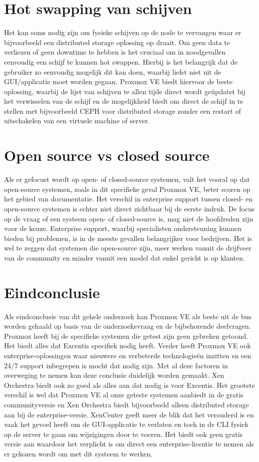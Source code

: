 \section{Hot swapping van schijven}
Het kan soms nodig zijn om fysieke schijven op de node te vervangen waar er bijvoorbeeld een distributed storage oplossing op draait. Om geen data te verliezen of geen downtime te hebben is het cruciaal om in noodgevallen eenvoudig een schijf te kunnen hot swappen.
Hierbij is het belangrijk dat de gebruiker zo eenvoudig mogelijk dit kan doen, waarbij liefst niet uit de GUI/applicatie moet worden gegaan.
Proxmox VE biedt hiervoor de beste oplossing, waarbij de lijst van schijven te allen tijde direct wordt geüpdatet bij het verwisselen van de schijf en de mogelijkheid biedt om direct de schijf in te stellen met bijvoorbeeld CEPH voor distributed storage zonder een restart of uitschakelen van een virtuele machine of server.
\newpage
\section{Open source vs closed source}
Als er gefocust wordt op open- of closed-source systemen, valt het vooral op dat open-source systemen, zoals in dit specifieke geval Proxmox VE, beter scoren op het gebied van documentatie. Het verschil in enterprise support tussen closed- en open-source systemen is echter niet direct zichtbaar bij de eerste indruk.
De focus op de vraag of een systeem open- of closed-source is, mag niet de hoofdreden zijn voor de keuze. Enterprise support, waarbij specialisten ondersteuning kunnen bieden bij problemen, is in de meeste gevallen belangrijker voor bedrijven.
Het is wel te zeggen dat systemen die open-source zijn, meer werken vanuit de drijfveer van de community en minder vanuit een model dat enkel gericht is op klanten.
\section{Eindconclusie}
Als eindconclusie van dit gehele onderzoek kan Proxmox VE als beste uit de bus worden gehaald op basis van de onderzoeksvraag en de bijbehorende deelvragen. Proxmox heeft bij de specifieke systemen die getest zijn geen gebreken getoond. Het biedt alles dat Excentis specifiek nodig heeft.
Verder heeft Proxmox VE ook enterprise-oplossingen waar nieuwere en verbeterde technologieën inzitten en een 24/7 support inbegrepen is mocht dat nodig zijn. Met al deze factoren in overweging te nemen kan deze conclusie duidelijk worden gemaakt.
Xen Orchestra biedt ook zo goed als alles aan dat nodig is voor Excentis. Het grootste verschil is wel dat Proxmox VE al onze geteste systemen aanbiedt in de gratis communityversie en Xen Orchestra biedt bijvoorbeeld alleen distributed storage aan bij de enterprise-versie.
XenCenter geeft meer de blik dat het verouderd is en vaak het gevoel heeft om de GUI-applicatie te verlaten en toch in de CLI fysiek op de server te gaan om wijzigingen door te voeren. Het biedt ook geen gratis versie aan waardoor het verplicht is om direct een enterprise-licentie te nemen als er gekozen wordt om met dit systeem te werken.

